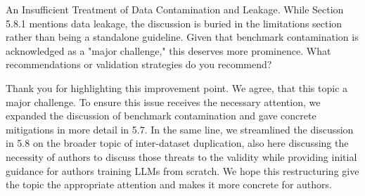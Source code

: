 \documentclass[12pt,english]{reviewresponse}
\begin{document}
\begin{revcomment}
An Insufficient Treatment of Data Contamination and Leakage. While Section 5.8.1 mentions data leakage, the discussion is buried in the limitations section rather than being a standalone guideline. Given that benchmark contamination is acknowledged as a "major challenge," this deserves more prominence. What recommendations or validation strategies do you recommend?
\end{revcomment}
\begin{revresponse}

Thank you for highlighting this improvement point. We agree, that this topic a major challenge. To ensure this issue receives the necessary attention, we expanded the discussion of benchmark contamination and gave concrete mitigations in more detail in 5.7. In the same line, we streamlined the discussion in 5.8 on the broader topic of inter-dataset duplication, also here discussing the necessity of authors to discuss those threats to the validity while providing initial guidance for authors training LLMs from scratch. We hope this restructuring give the topic the appropriate attention and makes it more concrete for authors.
\end{revresponse}
\end{document}
